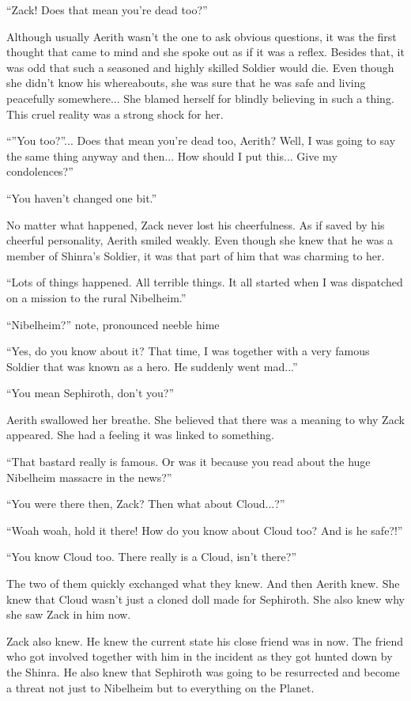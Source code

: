\documentclass[oneside]{book}
\begin{document}
“Zack! Does that mean you're dead too?”

Although usually Aerith wasn't the one to ask obvious questions, it was the first thought that came to mind and she spoke out as if it was a reflex. Besides that, it was odd that such a seasoned and highly skilled Soldier would die. Even though she didn't know his whereabouts, she was sure that he was safe and living peacefully somewhere... She blamed herself for blindly believing in such a thing. This cruel reality was a strong shock for her.

“”You too?”... Does that mean you're dead too, Aerith? Well, I was going to say the same thing anyway and then... How should I put this... Give my condolences?”

“You haven't changed one bit.”

No matter what happened, Zack never lost his cheerfulness. As if saved by his cheerful personality, Aerith smiled weakly. Even though she knew that he was a member of Shinra's Soldier, it was that part of him that was charming to her.

“Lots of things happened. All terrible things. It all started when I was dispatched on a mission to the rural Nibelheim.”

“Nibelheim?” note, pronounced neeble hime

“Yes, do you know about it? That time, I was together with a very famous Soldier that was known as a hero. He suddenly went mad...”

“You mean Sephiroth, don't you?”

Aerith swallowed her breathe. She believed that there was a meaning to why Zack appeared. She had a feeling it was linked to something.

“That bastard really is famous. Or was it because you read about the huge Nibelheim massacre in the news?”

“You were there then, Zack? Then what about Cloud...?”

“Woah woah, hold it there! How do you know about Cloud too? And is he safe?!”

“You know Cloud too. There really is a Cloud, isn't there?”

The two of them quickly exchanged what they knew. And then Aerith knew. She knew that Cloud wasn't just a cloned doll made for Sephiroth. She also knew why she saw Zack in him now.

Zack also knew. He knew the current state his close friend was in now. The friend who got involved together with him in the incident as they got hunted down by the Shinra. He also knew that Sephiroth was going to be resurrected and become a threat not just to Nibelheim but to everything on the Planet.
\end{document}
